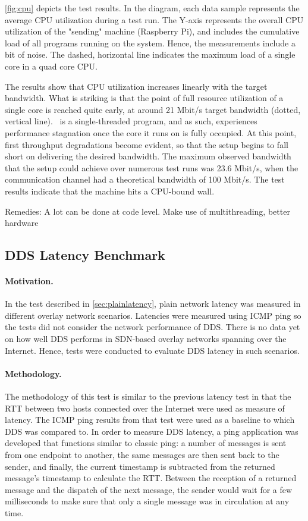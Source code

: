 \autoref{fig:cpu} depicts the test results. In the diagram, each data sample represents the average CPU utilization during a test run. The Y-axis represents the overall CPU utilization of the "sending" machine (Raspberry Pi), and includes the cumulative load of all programs running on the system. Hence, the measurements include a bit of noise. The dashed, horizontal line indicates the maximum load of a single core in a quad core CPU.

The results show that CPU utilization increases linearly with the target bandwidth. What is striking is that the point of full resource utilization of a single core is reached quite early, at around 21 Mbit/s target bandwidth (dotted, vertical line). \wnet\ is a single-threaded program, and as such, experiences performance stagnation once the core it runs on is fully occupied. At this point, first throughput degradations become evident, so that the setup begins to fall short on delivering the desired bandwidth. The maximum observed bandwidth that the setup could achieve over numerous test runs was 23.6 Mbit/s, when the communication channel had a theoretical bandwidth of 100 Mbit/s. The test results indicate that the machine hits a CPU-bound wall.


Remedies: A lot can be done at code level. Make use of multithreading, better hardware
%
%
%
%
%
%
%
%
%
%

\subsection{DDS Latency Benchmark} \label{sec:ddslatency}

\paragraph{Motivation.} In the test described in \autoref{sec:plainlatency}, plain network latency was measured in different overlay network scenarios. Latencies were measured using ICMP ping so the tests did not consider the network performance of DDS. There is no data yet on how well DDS performs in SDN-based overlay networks spanning over the Internet. Hence, tests were conducted to evaluate DDS latency in such scenarios.

\paragraph{Methodology.} The methodology of this test is similar to the previous latency test in that the RTT between two hosts connected over the Internet were used as measure of latency. The ICMP ping results from that test were used as a baseline to which DDS was compared to. In order to measure DDS latency, a ping application was developed that functions similar to classic ping: a number of messages is sent from one endpoint to another, the same messages are then sent back to the sender, and finally, the current timestamp is subtracted from the returned message's timestamp to calculate the RTT. Between the reception of a returned message and the dispatch of the next message, the sender would wait for a few milliseconds to make sure that only a single message was in circulation at any time.

